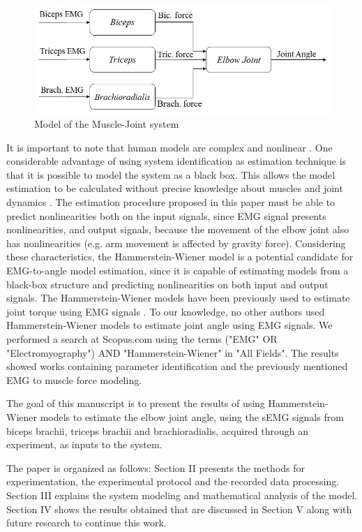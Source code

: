 \documentclass[letterpaper, 10 pt, conference]{ieeeconf}  %
\begin{document}
\begin{figure}[h]
      \centering
      \includegraphics[width=0.98\columnwidth]{Images/Mechanical_Model.jpg}
      \caption{Model of the Muscle-Joint system}
      \label{ModelMuscle-Joint}
   \end{figure}

It is important to note that human models are complex and nonlinear \cite{kato2015}. One considerable advantage of using system identification as estimation technique is that it is possible to model the system as a black box. This allows the model estimation to be calculated without precise knowledge about muscles and joint dynamics \cite{Abbasi-Asl2011}. The estimation procedure proposed in this paper must be able to predict nonlinearities both on the input signals, since EMG signal presents nonlinearities, and output signals, because the movement of the elbow joint also has nonlinearities (e.g. arm movement is affected by gravity force). Considering these characteristics, the Hammerstein-Wiener model is a potential candidate for EMG-to-angle model estimation, since it is capable of estimating models from a black-box structure and predicting nonlinearities on both input and output signals. The Hammerstein-Wiener models have been previously used to estimate joint torque using EMG signals \cite{Abbasi-Asl2011,sab2010,clancy2012}. To our knowledge, no other authors used Hammerstein-Wiener models to estimate joint angle using EMG signals. We performed a search at Scopus.com using the terms ("EMG" OR "Electromyography") AND "Hammerstein-Wiener" in "All Fields". The results showed works containing parameter identification and the previously mentioned EMG to muscle force modeling.

The goal of this manuscript is to present the results of using Hammerstein-Wiener models to estimate the elbow joint angle, using the sEMG signals from biceps brachii, triceps brachii and brachioradialis, acquired through an experiment, as inputs to the system.

The paper is organized as follows: Section II presents the methods for experimentation, the experimental protocol and the recorded data processing. Section III explains the system modeling and mathematical analysis of the model. Section IV shows the results obtained that are discussed in Section V along with future research to continue this work.
\end{document}
